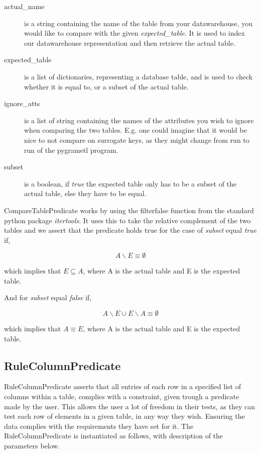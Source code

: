 \begin{description}
\item [actual\_name] is a string containing the name of the table from your datawarehouse, you would like to compare with the given \textit{expected\_table}. It is used to index our datawarehouse representation and then retrieve the actual table.
\item [expected\_table] is a list of dictionaries, representing a database table, and is used to check whether it is equal to, or a subset of the actual table.
\item [ignore\_atts] is a list of string containing the names of the attributes you wish to ignore when comparing the two tables. E.g. one could imagine that it would be nice to not compare on surrogate keys, as they might change from run to run of the pygrametl program.
  \item [subset] is a boolean, if \textit{true} the expected table only has to be a subset of the actual table, else they have to be equal.
\end{description}

CompareTablePredicate works by using the filterfalse function from the standard python package \textit{itertools}. It uses this to take the relative complement of the two tables and we assert that the predicate holds true for the case of \textit{subset} equal \textit{true} if,

\[ A \backslash E \equiv \emptyset \]

\noindent which implies that $E \subseteq A$, where A is the actual table and E is the expected table.

And for \textit{subset} equal \textit{false} if,

\[ A \backslash E \cup E \backslash A \equiv \emptyset \]

\noindent which implies that $A \equiv E$, where A is the actual table and E is the expected table.

\subsection{RuleColumnPredicate}

RuleColumnPredicate asserts that all entries of each row in a specified list of columns within a table, complies with a constraint, given trough a predicate made by the user. This allows the user a lot of freedom in their tests, as they can test each row of elements in a given table, in any way they wish. Ensuring the data complies with the requirements they have set for it. The RuleColumnPredicate is instantiated as follows, with description of the parameters below.

